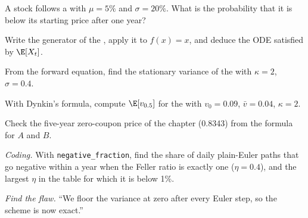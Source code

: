 \begin{exercise}[$\star$]\label{exo:qm:stochastic-differential-equations:2}
A stock follows a  with $\mu = 5\%$ and $\sigma = 20\%$. What is the probability
that it is below its starting price after one year?
\end{exercise}

\begin{exercise}[$\star$]\label{exo:qm:stochastic-differential-equations:3}
Write the generator of the , apply it to $f(x) = x$, and deduce the ODE
satisfied by $\E[X_t]$.
\end{exercise}

\begin{exercise}[$\star\star$]\label{exo:qm:stochastic-differential-equations:4}
From the forward equation, find the stationary variance of the  with
$\kappa = 2$, $\sigma = 0.4$.
\end{exercise}

\begin{exercise}[$\star\star$]\label{exo:qm:stochastic-differential-equations:5}
With Dynkin's formula, compute $\E[v_{0.5}]$ for the  with $v_0 = 0.09$, $\bar v =
0.04$, $\kappa = 2$.
\end{exercise}

\begin{exercise}[$\star\star$]\label{exo:qm:stochastic-differential-equations:6}
Check the five-year zero-coupon price of the chapter (0.8343) from the formula for $A$ and $B$.
\end{exercise}

\begin{exercise}[$\star\star\star$]\label{exo:qm:stochastic-differential-equations:7}
\emph{Coding.} With \texttt{negative\_fraction}, find the share of daily plain-Euler paths that go
negative within a year when the Feller ratio is exactly one ($\eta = 0.4$), and the largest $\eta$ in
the table for which it is below 1\%.
\end{exercise}

\begin{exercise}[$\star\star\star$]\label{exo:qm:stochastic-differential-equations:8}
\emph{Find the flaw.} ``We floor the variance at zero after every Euler step, so the scheme is
now exact.''
\end{exercise}

